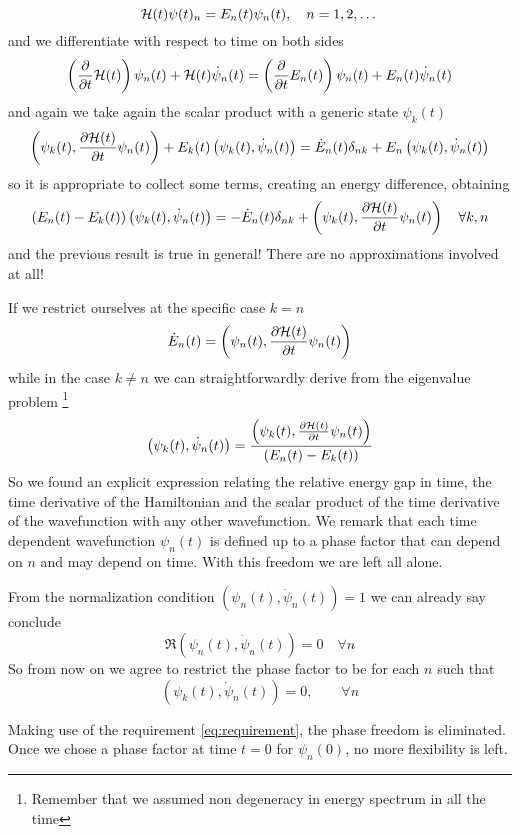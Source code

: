 \begin{equation}
\mathcal{H}(t) \psi(t)_n=E_n(t)\psi_n(t), \quad n=1,2,\dots  
\end{equation}
and we differentiate with respect to time on both sides
\begin{equation}
\left(\frac{\partial }{\partial t}\mathcal{H}(t)\right)\psi_n(t) +\mathcal{H}(t)\dot{\psi}_n(t)=\left(\frac{\partial }{\partial t}E_n(t)\right)\psi_n(t)+E_n(t)\dot{\psi}_n(t)
\end{equation}
and again we take again the scalar product with a generic state $ \psi_k(t) $
\begin{equation}
\left(\psi_k(t),\frac{\partial \mathcal{H}(t)}{\partial t}\psi_n(t) \right)+E_k(t)\left(\psi_k(t),\dot{\psi}_n(t) \right)=\dot{E}_n(t)\delta_{nk}+E_n\left(\psi_k(t),\dot{\psi}_n(t) \right)
\end{equation}
so it is appropriate to collect some terms, creating an energy difference, obtaining 
\begin{equation}
\left(E_n(t)-E_k(t)\right)\left(\psi_k(t),\dot{\psi}_n(t) \right)=-\dot{E}_n(t)\delta_{nk}+\left(\psi_k(t),\frac{\partial \mathcal{H}(t)}{\partial t}\psi_n(t) \right)\quad \forall k,n
\end{equation}
and the previous result is true in general! There are no approximations involved at all!

If we restrict ourselves at the specific case $ k=n $
\begin{equation}
\dot{E}_n(t)=\left(\psi_n(t),\frac{\partial \mathcal{H}(t)}{\partial t}\psi_n(t) \right)
\end{equation}
while in the case $ k\neq n $ we can straightforwardly derive from the eigenvalue problem \footnote{Remember that we assumed non degeneracy in energy spectrum in all the time}
\begin{equation}
\left(\psi_k(t),\dot{\psi}_n(t)\right)=\frac{\left(\psi_k(t),\frac{\partial \mathcal{H}(t)}{\partial t}\psi_n(t) \right)}{\left(E_n(t)-E_k(t)\right)}
\end{equation}
So we found an explicit expression relating the relative energy gap in time, the time derivative of the Hamiltonian and the scalar product of the time derivative of the wavefunction with any other wavefunction. We remark that each time dependent wavefunction $ \psi_n(t) $ is defined up to a phase factor that can depend on $ n $ and may depend on time. With this freedom we are left all alone. 

From the normalization condition $ \left(\psi_n(t),\dot{\psi}_n(t)\right)=1 $ we can already say conclude \[ \Re\left(\psi_n(t),\dot{\psi}_n(t)\right)=0\quad \forall n \]
So from now on we agree to restrict the phase factor to be for each $ n $ such that 
\begin{equation}
\left(\psi_k(t),\dot{\psi}_n(t)\right)=0, \qquad \forall n
\label{eq:requirement}
\end{equation}
\begin{rem}
	Making use of the requirement \eqref{eq:requirement}, the phase freedom is eliminated. Once we chose a phase factor at time $ t=0 $ for $ \psi_n(0) $, no more flexibility is left.
\end{rem}

